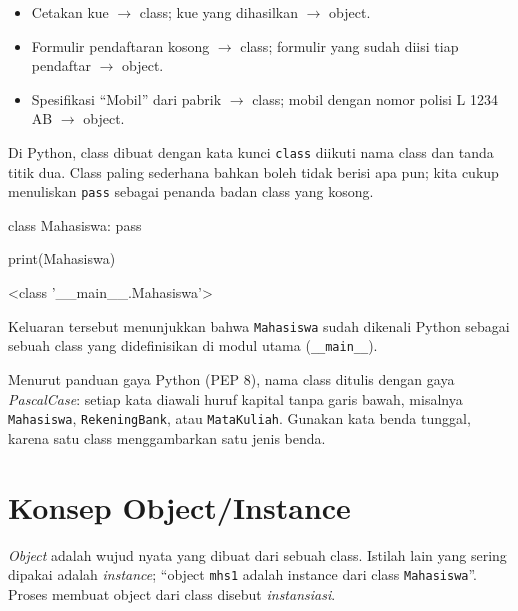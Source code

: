 \begin{contoh}
\begin{itemize}
  \item Cetakan kue $\rightarrow$ class; kue yang dihasilkan $\rightarrow$ object.
  \item Formulir pendaftaran kosong $\rightarrow$ class; formulir yang sudah diisi tiap pendaftar $\rightarrow$ object.
  \item Spesifikasi ``Mobil'' dari pabrik $\rightarrow$ class; mobil dengan nomor polisi L 1234 AB $\rightarrow$ object.
\end{itemize}
\end{contoh}

Di Python, class dibuat dengan kata kunci \texttt{class} diikuti nama class dan tanda titik dua. Class paling sederhana bahkan boleh tidak berisi apa pun; kita cukup menuliskan \texttt{pass} sebagai penanda badan class yang kosong.

\begin{kode}
class Mahasiswa:
    pass

print(Mahasiswa)
\end{kode}

\begin{keluaran}
<class '__main__.Mahasiswa'>
\end{keluaran}

Keluaran tersebut menunjukkan bahwa \texttt{Mahasiswa} sudah dikenali Python sebagai sebuah class yang didefinisikan di modul utama (\texttt{\_\_main\_\_}).

\begin{tips}
Menurut panduan gaya Python (PEP 8), nama class ditulis dengan gaya \emph{PascalCase}: setiap kata diawali huruf kapital tanpa garis bawah, misalnya \texttt{Mahasiswa}, \texttt{RekeningBank}, atau \texttt{MataKuliah}. Gunakan kata benda tunggal, karena satu class menggambarkan satu jenis benda.
\end{tips}

\section{Konsep Object/Instance}

\emph{Object} adalah wujud nyata yang dibuat dari sebuah class. Istilah lain yang sering dipakai adalah \emph{instance}; ``object \texttt{mhs1} adalah instance dari class \texttt{Mahasiswa}''. Proses membuat object dari class disebut \emph{instansiasi}.

